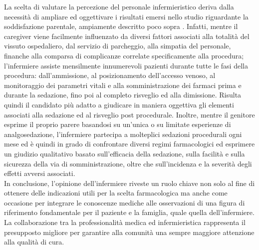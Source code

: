 La scelta di valutare la percezione del personale infermieristico deriva dalla necessità di ampliare ed oggettivare i risultati emersi nello studio riguardante la soddisfazione parentale, ampiamente descritto poco sopra \cite{Cortellazzo2022}. Infatti, mentre il caregiver viene facilmente influenzato da diversi fattori associati alla totalità del vissuto ospedaliero, dal servizio di parcheggio, alla simpatia del personale, finanche alla comparsa di complicanze correlate specificamente alla procedura; l'infermiere assiste mensilmente innumerevoli pazienti durante tutte le fasi della procedura: dall'ammissione, al posizionamento dell'accesso venoso, al monitoraggio dei parametri vitali e alla somministrazione dei farmaci prima e durante la sedazione, fino poi al completo risveglio ed alla dimissione. Risulta quindi il candidato più adatto a giudicare in maniera oggettiva gli elementi associati alla sedazione ed al risveglio post procedurale. Inoltre, mentre il genitore esprime il proprio parere basandosi su un'unica o su limitate esperienze di analgosedazione, l'infermiere partecipa a molteplici sedazioni procedurali ogni mese ed è quindi in grado di confrontare diversi regimi farmacologici ed esprimere un giudizio qualitativo basato sull'efficacia della sedazione, sulla facilità e sulla sicurezza della via di somministrazione, oltre che sull'incidenza e la severità degli effetti avversi associati.
\\In conclusione, l'opinione dell'infermiere riveste un ruolo chiave non solo al fine di ottenere delle indicazioni utili per la scelta farmacologica ma anche come occasione per integrare le conoscenze mediche alle osservazioni di una figura di riferimento fondamentale per il paziente e la famiglia, quale quella dell'infermiere. La collaborazione tra la professionalità medica ed infermieristica rappresenta il presupposto migliore per garantire alla comunità una sempre maggiore attenzione alla qualità di cura. 






